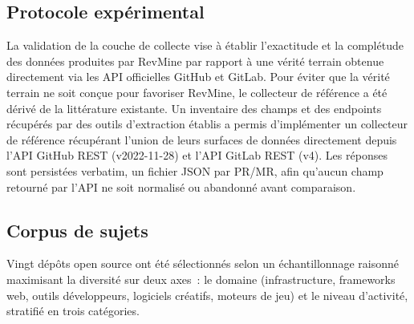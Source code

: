 \subsection{Protocole expérimental}

La validation de la couche de collecte vise à établir l'exactitude et la complétude des données
produites par RevMine par rapport à une vérité terrain obtenue directement via les API officielles
GitHub et GitLab. Pour éviter que la vérité terrain ne soit conçue pour favoriser RevMine, le
collecteur de référence a été dérivé de la littérature existante. Un inventaire des champs et
des endpoints récupérés par des outils d'extraction établis
\parencite{gousios2017mining, bouraffa2025not, rebatchi2024dependabot, legault2022empirical,
kansab2025empirical} a permis d'implémenter un collecteur de référence récupérant l'union de
leurs surfaces de données directement depuis l'API GitHub REST (v2022-11-28) et l'API GitLab
REST (v4). Les réponses sont persistées verbatim, un fichier JSON par PR/MR, afin qu'aucun
champ retourné par l'API ne soit normalisé ou abandonné avant comparaison.

\subsection{Corpus de sujets}

Vingt dépôts open source ont été sélectionnés selon un échantillonnage raisonné
\parencite{wohlin2012experimentation} maximisant la diversité sur deux axes~: le domaine
(infrastructure, frameworks web, outils développeurs, logiciels créatifs, moteurs de jeu) et
le niveau d'activité, stratifié en trois catégories.

